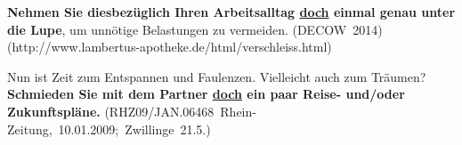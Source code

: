 {\begin{exe}
	\ex\label{1084} 
	\scriptsize
	\textbf{Nehmen Sie diesbezüglich Ihren Arbeitsalltag \underline{doch} einmal genau unter die Lupe}, um unnötige Belastungen zu vermeiden.	
	\hfill\hbox{(DECOW 2014)}  
	\newline
	\hbox{}\hfill\hbox{(http://www.lambertus-apotheke.de/html/verschleiss.html)} 				     
\end{exe}

\begin{exe}
	\ex\label{1085} 
	\scriptsize
	Nun ist Zeit zum Entspannen und Faulenzen. Vielleicht auch zum Träumen? \textbf{Schmieden Sie mit dem Partner \underline{doch} ein paar Reise- und/oder 	Zukunftspläne.} 	
	\newline
	\hbox{}\hfill\hbox{(RHZ09/JAN.06468 Rhein-Zeitung, 10.01.2009; Zwillinge 21.5.)} 				     
\end{exe}
				        
}
